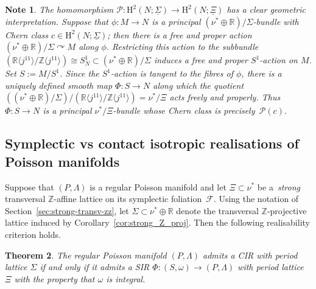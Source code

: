 \documentclass[10pt,a4paper]{amsart}
\numberwithin{equation}{section}
\newtheorem{Theorem}{Theorem}[section]
\newtheorem{Note}[Theorem]{Note}
\newcommand{\SM}{(S,\omega)} %
\newcommand{\PM}{(P,\Lambda)} %
\newcommand{\HH}{\mathrm{H}}
\newcommand{\RR}{\mathbb{R}}
\newcommand{\ZZ}{\mathbb{Z}}
\begin{document}
\begin{Note}\label{obs:geom_inter_P}
The homomorphism $\mathcal{P} \colon \HH^2(N;\underline{\Sigma}) \to \HH^2(N;\underline{\Xi})$ has a clear geometric interpretation. Suppose that $\phi \colon M \to N$ is a principal $(\nu^* \oplus \RR)/\Sigma$-bundle with Chern class $c \in \HH^2(N;\underline{\Sigma})$; then there is a free and proper action $(\nu^* \oplus \RR)/\Sigma \curvearrowright M$ along $\phi$. Restricting this action to the subbundle $(\RR \langle j^11\rangle/ \ZZ \langle j^11 \rangle ) \cong S^1_N \subset (\nu^* \oplus \RR)/\Sigma$ induces a free and proper $S^1$-action on $M$. Set $S:=M/S^1$. Since the $S^1$-action is tangent to the f\/ibres of $\phi$, there is a uniquely def\/ined smooth map $\Phi \colon S \to N$ along which the quotient $((\nu^* \oplus \RR)/\Sigma)/(\RR \langle j^11\rangle/ \ZZ \langle j^11 \rangle ) = \nu^*/\Xi$ acts freely and properly. Thus $\Phi \colon S \to N$ is a principal $\nu^*/\Xi$-bundle whose Chern class is precisely~$\mathcal{P}(c)$.
\end{Note}

\subsection{Symplectic vs contact isotropic realisations of Poisson manifolds}\label{sec:sympl-vs-cont}
Suppose that $\PM$ is a regular Poisson manifold and let $\Xi \subset \nu^*$ be a~{\it strong} transversal $\ZZ$-af\/f\/ine lattice on its symplectic foliation~$\mathcal{F}$. Using the notation of Section~\ref{sec:strong-transv-zz}, let $\Sigma \subset \nu^*\oplus \RR$ denote the transversal $\ZZ$-projective lattice induced by Corollary~\ref{cor:strong_Z_proj}. Then the following realisability criterion holds.

\begin{Theorem}\label{thm:cir_vs_sir}
The regular Poisson manifold $\PM$ admits a CIR with period lattice $\Sigma$ if and only if it admits a SIR $\Phi \colon \SM \to \PM$ with period lattice~$\Xi$ with the property that $\omega$ is integral.
\end{Theorem}
\end{document}
